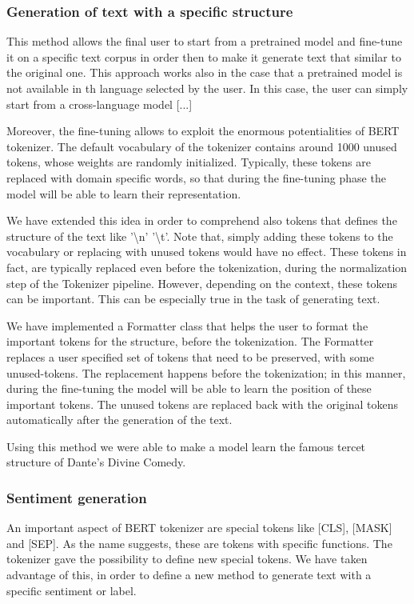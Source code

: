 \documentclass[10pt,twocolumn,letterpaper]{article}
\begin{document}
\subsubsection{Generation of text with a specific structure}

This method allows the final user to start from a pretrained model and fine-tune it on a specific
text corpus in order then to make it generate text that similar to the original one.
This approach works also in the case that a pretrained model is not available in th language selected by the user.
In this case, the user can simply start from a cross-language model [...]

Moreover, the fine-tuning allows to exploit the enormous potentialities of BERT tokenizer.
The default vocabulary of the tokenizer contains around 1000 unused tokens, whose weights are randomly initialized.
Typically, these tokens are replaced with domain specific words, so that during the fine-tuning phase
the model will be able to learn their representation.

We have extended this idea in order to comprehend also tokens that defines
the structure of the text like '\textbackslash n' '\textbackslash t'.
Note that, simply adding these tokens to the vocabulary or replacing with unused tokens would have no effect.
These tokens in fact, are typically replaced even before the tokenization, during the normalization step of the Tokenizer pipeline.
However, depending on the context, these tokens can be important. This can be especially true in the task of generating text.

We have implemented a Formatter class that helps the user to format the important tokens for the structure, before the tokenization.
The Formatter replaces a user specified set of tokens that need to be preserved, with some unused-tokens.
The replacement happens before the tokenization; in this manner, during the fine-tuning the model will be able to learn
the position of these important tokens.
The unused tokens are replaced back with the original tokens automatically after the generation of the text.

Using this method we were able to make a model learn the famous tercet structure of Dante's Divine Comedy.

\subsubsection{Sentiment generation}
\label{sentiment}
An important aspect of BERT tokenizer are special tokens like [CLS], [MASK] and [SEP].
As the name suggests, these are tokens with specific functions.
The tokenizer gave the possibility to define new special tokens.
We have taken advantage of this, in order to define a new method to generate text with a specific sentiment or label.
\end{document}
